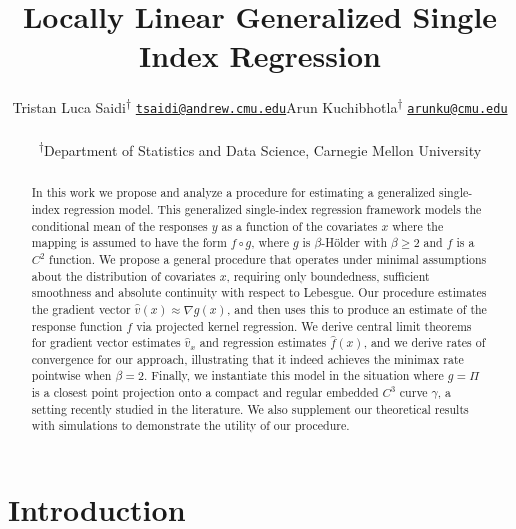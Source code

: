 \documentclass[11pt]{article}
\title{Locally Linear Generalized Single Index Regression}
\author{
\begin{tabular}{c c c}
\makecell[c]{Tristan Luca Saidi\textsuperscript{\(\dagger\)}\\
\href{mailto:tsaidi@andrew.cmu.edu}{\nolinkurl{tsaidi@andrew.cmu.edu}}}
&
\makecell[c]{Arun Kuchibhotla\textsuperscript{\(\dagger\)}\\
\href{mailto:karun3kumar@gmail.com}
{\nolinkurl{arunku@cmu.edu}}}
\end{tabular}\\[0.75em]
\textsuperscript{\(\dagger\)}Department of Statistics and Data Science, Carnegie Mellon University
}
\begin{document}

\maketitle


\begin{abstract}
    In this work we propose and analyze a procedure for estimating a generalized single-index regression model. This generalized single-index regression framework models the conditional mean of the responses $y$ as a function of the covariates $x$ where the mapping is assumed to have the form $f \circ g$, where $g$ is $\beta$-H\"older with $\beta \geq 2$ and $f$ is a $C^2$ function. We propose a general procedure that operates under minimal assumptions about the distribution of covariates $x$, requiring only boundedness, sufficient smoothness and absolute continuity with respect to Lebesgue. Our procedure estimates the gradient vector $\hat v(x) \approx \nabla g(x)$, and then uses this to produce an estimate of the response function $f$ via projected kernel regression. We derive central limit theorems for gradient vector estimates $\hat{v}_x$ and regression estimates $\hat{f}(x)$, and we derive rates of convergence for our approach, illustrating that it indeed achieves the minimax rate pointwise when $\beta = 2$.  Finally, we instantiate this model in the situation where $g = \Pi$ is a closest point projection onto a compact and regular embedded $C^3$ curve $\gamma$, a setting recently studied in the literature. We also supplement our theoretical results with simulations to demonstrate the utility of our procedure.   
\end{abstract}


\section{Introduction}
\end{document}
